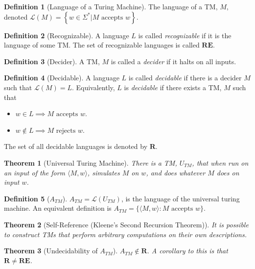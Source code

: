 \documentclass[12pt]{article}
\newtheorem{theorem}{Theorem}[section]
\theoremstyle{definition}
\newtheorem{definition}{Definition}[section]
\begin{document}
\begin{definition}[Language of a Turing Machine]
    The language of a TM, $M$, denoted $\mathcal{L}(M)  = \left\{ w \in \Sigma^* | M \text{ accepts } w \right\}$.
\end{definition}

\begin{definition}[Recognizable]
    A language $L$ is called \emph{recognizable} if it is the language of some TM. The set of recognizable languages is called $\mathbf{RE}$.
\end{definition}

\begin{definition}[Decider]
    A TM, $M$ is called a \emph{decider} if it halts on all inputs.
\end{definition}

\begin{definition}[Decidable]
    A language $L$ is called \emph{decidable} if there is a decider $M$ such that $\mathcal{L}(M) = L$. Equivalently, $L$ is \emph{decidable} if there exists a TM, $M$ such that 
    \begin{itemize}
        \item $w\in L \implies M \text{ accepts } w$.
        \item $w\notin L \implies M \text{ rejects } w$.
    \end{itemize}
    The set of all decidable languages is denoted by $\mathbf{R}$.
\end{definition}
\begin{theorem}[Universal Turing Machine]
    There is a TM, $U_{TM}$, that when run on an input of the form $\langle M, w \rangle$, simulates $M$ on $w$, and does whatever $M$ does on input $w$.
\end{theorem}

\begin{definition}[$A_{TM}$]
    $A_{TM} = \mathcal{L}(U_{TM})$, is the language of the universal turing machine. An equivalent definition is $A_{TM} = \{\langle M, w \rangle: M \text{ accepts } w\}$.
\end{definition}

\begin{theorem}[Self-Reference (Kleene's Second Recursion Theorem)]
    It is possible to construct TMs that perform arbitrary computations on their own descriptions.
\end{theorem}

\begin{theorem}[Undecidability of $A_{TM}$]
    $A_{TM} \notin \mathbf{R}$. A corollary to this is that $\mathbf{R} \neq \mathbf{RE}$.
\end{theorem}
\end{document}
